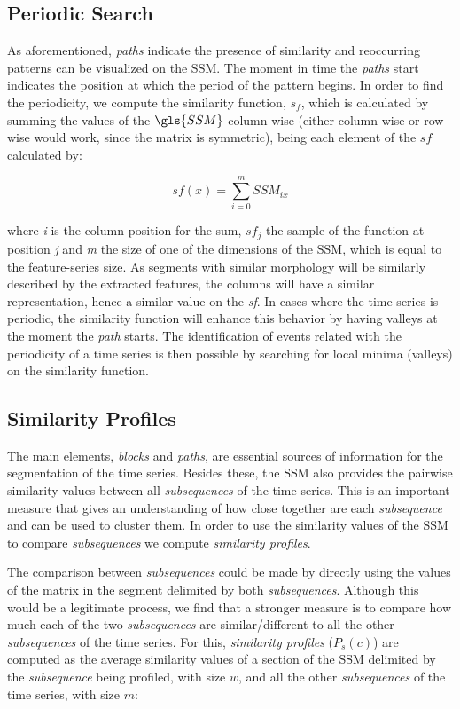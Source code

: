 \subsection{Periodic Search}

As aforementioned, \textit{paths} indicate the presence of similarity and reoccurring patterns can be visualized on the \gls{SSM}. The moment in time the \textit{paths} start indicates the position at which the period of the pattern begins. In order to find the periodicity, we compute the similarity function, $s_f$, which is calculated by summing the values of the $\gls{SSM}$ column-wise (either column-wise or row-wise would work, since the matrix is symmetric), being each element of the $sf$ calculated by:

\begin{equation}
sf(x) = \sum_{i=0}^{m}{SSM_{ix}}
\end{equation}

\noindent where \textit{i} is the column position for the sum, $sf_{j}$ the sample of the function at position \textit{j} and \textit{m} the size of one of the dimensions of the \gls{SSM}, which is equal to the feature-series size. As segments with similar morphology will be similarly described by the extracted features, the columns will have a similar representation, hence a similar value on the \textit{sf}. In cases where the time series is periodic, the similarity function will enhance this behavior by having valleys at the moment the \textit{path} starts. The identification of events related with the periodicity of a time series is then possible by searching for local minima (valleys) on the similarity function.  

\subsection{Similarity Profiles}

The main elements, \textit{blocks} and \textit{paths}, are essential sources of information for the segmentation of the time series. Besides these, the \gls{SSM} also provides the pairwise similarity values between all \textit{subsequences} of the time series. This is an important measure that gives an understanding of how close together are each \textit{subsequence} and can be used to cluster them. In order to use the similarity values of the \gls{SSM} to compare \textit{subsequences} we compute \textit{similarity profiles}.
\par
The comparison between \textit{subsequences} could be made by directly using the values of the matrix in the segment delimited by both \textit{subsequences}. Although this would be a legitimate process, we find that a stronger measure is to compare how much each of the two \textit{subsequences} are similar/different to all the other \textit{subsequences} of the time series. For this, \textit{similarity profiles} ($P_s(c)$) are computed as the average similarity values of a section of the \gls{SSM} delimited by the \textit{subsequence} being profiled, with size $w$,  and all the other \textit{subsequences} of the time series, with size $m$:


